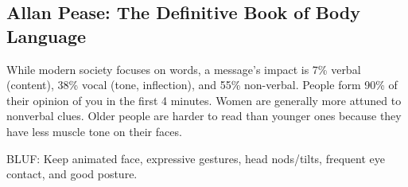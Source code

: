 \documentclass[
]{article}
\begin{document}
\hypertarget{allan-pease-the-definitive-book-of-body-language}{%
\subsection{Allan Pease: The Definitive Book of Body
Language}\label{allan-pease-the-definitive-book-of-body-language}}

While modern society focuses on words, a message's impact is 7\% verbal
(content), 38\% vocal (tone, inflection), and 55\% non-verbal. People
form 90\% of their opinion of you in the first 4 minutes. Women are
generally more attuned to nonverbal clues. Older people are harder to
read than younger ones because they have less muscle tone on their
faces.

BLUF: Keep animated face, expressive gestures, head nods/tilts, frequent
eye contact, and good posture.
\end{document}
